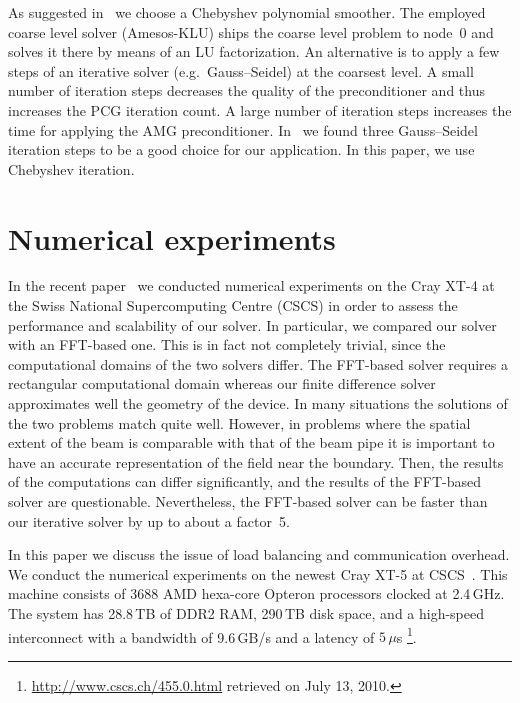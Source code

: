 \documentclass[oribibl]{llncs}
\begin{document}
As suggested in~\cite{abht:03} we choose a Chebyshev polynomial
smoother.  The employed coarse level solver (Amesos-KLU) ships the
coarse level problem to node~0 and solves it there by means of an LU
factorization.  An alternative is to apply a few steps of an iterative
solver (e.g.\ Gauss--Seidel) at the coarsest level.  A small number of
iteration steps decreases the quality of the preconditioner and thus
increases the PCG iteration count.  A large number of iteration steps
increases the time for applying the AMG preconditioner.
In~\cite{adai:10} we found three Gauss--Seidel iteration steps to be a
good choice for our application.  In this paper, we use Chebyshev
iteration.

\section{Numerical experiments}
\label{sec:analysis}

In the recent paper~\cite{adai:10} we conducted numerical experiments on
the Cray XT-4 at the Swiss National Supercomputing Centre (CSCS) in
order to assess the performance and scalability of our solver.  In
particular, we compared our solver with an FFT-based one.  This is in
fact not completely trivial, since the computational domains of the two
solvers differ.  The FFT-based solver requires a rectangular
computational domain whereas our finite difference solver approximates
well the geometry of the device.  In many situations the solutions of
the two problems match quite well.  However, in problems where the
spatial extent of the beam is comparable with that of the beam pipe it
is important to have an accurate representation of the field near the
boundary.  Then, the results of the computations can differ
significantly, and the results of the FFT-based solver are questionable.
Nevertheless, the FFT-based solver can be faster than our iterative
solver by up to about a factor~5.

In this paper we discuss the issue of load balancing and communication
overhead.  We conduct the numerical experiments on the newest Cray XT-5
at CSCS~\cite{cray-xt5}.  This machine consists of 3688 AMD hexa-core
Opteron processors clocked at 2.4\,GHz.  The system has 28.8\,TB of DDR2
RAM, 290\,TB disk space, and a high-speed interconnect with a bandwidth
of 9.6\,GB/s and a latency of $5\,\mu$s%
\footnote{\url{http://www.cscs.ch/455.0.html} retrieved on
  July 13, 2010.}.
\end{document}
